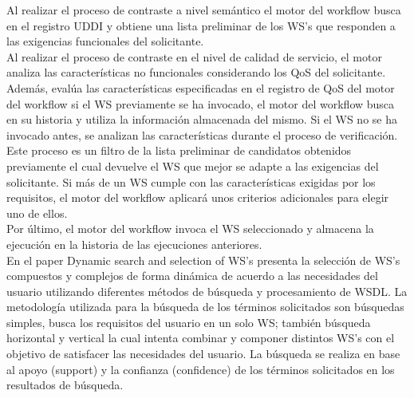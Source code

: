 Al realizar el proceso de contraste a nivel semántico el motor del workflow busca en el registro UDDI y obtiene una lista preliminar de los WS's que responden a las exigencias funcionales del solicitante. \\

Al realizar el proceso de contraste en el nivel de calidad de servicio, el motor analiza las características no funcionales considerando los QoS del solicitante. Además, evalúa las características especificadas en el registro de QoS del motor del workflow si el WS previamente se ha invocado, el motor del workflow busca en su historia y utiliza la información almacenada del mismo. Si el WS no se ha invocado antes, se analizan las características durante el proceso de verificación. Este proceso es un filtro de la lista preliminar de candidatos obtenidos previamente el cual devuelve el WS que mejor se adapte a las exigencias del solicitante. Si más de un WS cumple con las características exigidas por los requisitos, el motor del workflow aplicará unos criterios adicionales para elegir uno de ellos.\\

Por último, el motor del workflow invoca el WS seleccionado y almacena la ejecución en la historia de las ejecuciones anteriores.\\

En el paper Dynamic search and selection of WS's \cite{Sumathi-Niranjan-2014} presenta la selección de WS's compuestos y complejos de forma dinámica de acuerdo a las necesidades del usuario utilizando diferentes métodos de búsqueda y procesamiento de WSDL. La metodología utilizada para la búsqueda de los términos solicitados son búsquedas simples, busca los requisitos del usuario en un solo WS;  también búsqueda horizontal y vertical la cual intenta combinar y componer distintos WS's con el objetivo de satisfacer las necesidades del usuario. La búsqueda se realiza en base al apoyo (support) y la confianza (confidence) de los términos solicitados en los resultados de búsqueda.

